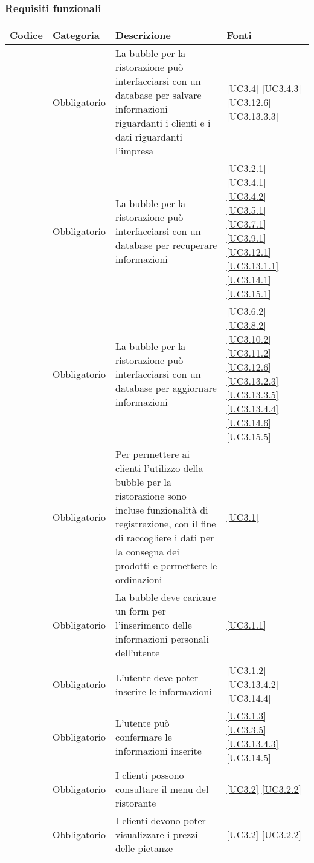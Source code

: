 \subsubsection{Requisiti funzionali}

\begin{longtable}{|P{1.5cm}|P{2.5cm}|P{6.5cm}|P{2.5cm}|}
	\hline \textbf{Codice} & \textbf{Categoria} & \textbf{Descrizione} & \textbf{Fonti} \\
	
	\hline \RequisitoObF\label{L21} & Obbligatorio & La bubble per la ristorazione può interfacciarsi con un database per salvare informazioni riguardanti i clienti e i dati riguardanti l'impresa & \ref{UC3.4} \ref{UC3.4.3} \ref{UC3.12.6} \ref{UC3.13.3.3} \\
	\hline \RequisitoObF\label{L61} & Obbligatorio & La bubble per la ristorazione può interfacciarsi con un database per recuperare informazioni & \ref{UC3.2.1} \ref{UC3.4.1} \ref{UC3.4.2} \ref{UC3.5.1} \ref{UC3.7.1}  \ref{UC3.9.1} \ref{UC3.12.1} \ref{UC3.13.1.1} \ref{UC3.14.1} \ref{UC3.15.1} \\
	\hline \RequisitoObF\label{L62} & Obbligatorio & La bubble per la ristorazione può interfacciarsi con un database per aggiornare informazioni & \ref{UC3.6.2} \ref{UC3.8.2} \ref{UC3.10.2} \ref{UC3.11.2} \ref{UC3.12.6}  \ref{UC3.13.2.3} \ref{UC3.13.3.5} \ref{UC3.13.4.4} \ref{UC3.14.6} \ref{UC3.15.5} \\	
	\hline \RequisitoObF\label{L22} & Obbligatorio & Per permettere ai clienti l'utilizzo della bubble per la ristorazione sono incluse funzionalità di registrazione, con il fine di raccogliere i dati per la consegna dei prodotti e permettere le ordinazioni & \ref{UC3.1} \\
	\hline \RequisitoObF\label{L96} & Obbligatorio & La bubble deve caricare un form per l'inserimento delle informazioni personali dell'utente & \ref{UC3.1.1} \\
	\hline \RequisitoObF\label{L97} & Obbligatorio & L'utente deve poter inserire le informazioni & \ref{UC3.1.2} \ref{UC3.13.4.2} \ref{UC3.14.4}\\
	\hline \RequisitoObF\label{L98} & Obbligatorio & L'utente può confermare le informazioni inserite & \ref{UC3.1.3} \ref{UC3.3.5} \ref{UC3.13.4.3} \ref{UC3.14.5}\\
	\hline \RequisitoObF\label{L23} & Obbligatorio & I clienti possono consultare il menu del ristorante & \ref{UC3.2} \ref{UC3.2.2}\\
	\hline \RequisitoObF \label{L68} & Obbligatorio & I clienti devono poter visualizzare i prezzi delle pietanze & \ref{UC3.2} \ref{UC3.2.2}\\

\end{longtable}
